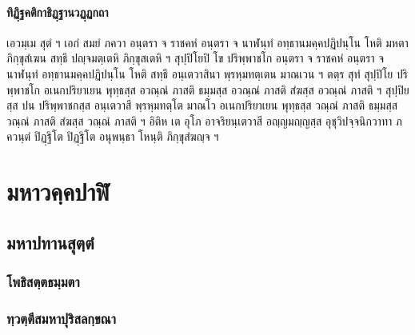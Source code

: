 \documentclass[
]{book}
\begin{document}
\hypertarget{uxe17uxe34uxe0fuxe3auxe34uxe10uxe04uxe15uxe34uxe01uxe32uxe18uxe34uxe0fuxe3auxe10uxe32uxe19uxe27uxe0fuxe3auxe0fuxe01uxe16uxe32}{%
\subsubsection{ทิฏฺิฐคติกาธิฏฺฐานวฏฺฏกถา}\label{uxe17uxe34uxe0fuxe3auxe34uxe10uxe04uxe15uxe34uxe01uxe32uxe18uxe34uxe0fuxe3auxe10uxe32uxe19uxe27uxe0fuxe3auxe0fuxe01uxe16uxe32}}

เอวมฺเม สุตํ ฯ เอกํ สมยํ ภควา อนฺตรา จ ราชคหํ อนฺตรา จ นาฬนฺทํ อทฺธานมคฺคปฏิปนฺโน โหติ มหตา ภิกฺขุสํเฆน สทฺธึ ปญฺจมตฺเตหิ ภิกฺขุสเตหิ ฯ สุปฺปิโยปิ โข ปริพฺพาชโก อนฺตรา จ ราชคหํ อนฺตรา จ นาฬนฺทํ อทฺธานมคฺคปฏิปนฺโน โหติ สทฺธึ อนฺเตวาสินา พฺรหฺมทตฺเตน มาณเวน ฯ ตตฺร สุทํ สุปฺปิโย ปริพฺพาชโก อเนกปริยาเยน พุทฺธสฺส อวณฺณํ ภาสติ ธมฺมสฺส อวณฺณํ ภาสติ สํฆสฺส อวณฺณํ ภาสติ ฯ สุปฺปิยสฺส ปน ปริพฺพาชกสฺส อนฺเตวาสี พฺรหฺมทตฺโต มาณโว อเนกปริยาเยน พุทฺธสฺส วณฺณํ ภาสติ ธมฺมสฺส วณฺณํ ภาสติ สํฆสฺส วณฺณํ ภาสติ ฯ อิติห เต อุโภ อาจริยนฺเตวาสี อญฺญมญฺญสฺส อุชุวิปจฺจนิกวาทา ภควนฺตํ ปิฏฺฐิโต ปิฏฺฐิโต อนุพนฺธา โหนฺติ ภิกฺขุสํฆญฺจ ฯ

\hypertarget{dm}{%
\chapter{มหาวคฺคปาฬิ}\label{dm}}

\hypertarget{uxe21uxe2buxe32uxe1buxe17uxe32uxe19uxe2auxe38uxe15uxe3auxe15uxe4d}{%
\section{มหาปทานสุตฺตํ}\label{uxe21uxe2buxe32uxe1buxe17uxe32uxe19uxe2auxe38uxe15uxe3auxe15uxe4d}}

\hypertarget{uxe42uxe1euxe18uxe34uxe2auxe15uxe3auxe15uxe18uxe21uxe3auxe21uxe15uxe32}{%
\subsection{โพธิสตฺตธมฺมตา}\label{uxe42uxe1euxe18uxe34uxe2auxe15uxe3auxe15uxe18uxe21uxe3auxe21uxe15uxe32}}

\hypertarget{uxe17uxe3auxe27uxe15uxe3auxe15uxe36uxe2auxe21uxe2buxe32uxe1buxe38uxe23uxe34uxe2auxe25uxe01uxe3auxe02uxe13uxe32}{%
\subsection{ทฺวตฺตึสมหาปุริสลกฺขณา}\label{uxe17uxe3auxe27uxe15uxe3auxe15uxe36uxe2auxe21uxe2buxe32uxe1buxe38uxe23uxe34uxe2auxe25uxe01uxe3auxe02uxe13uxe32}}
\end{document}

